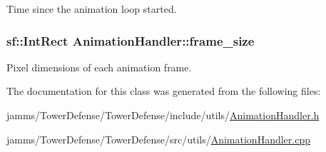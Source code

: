 Time since the animation loop started. 

\hypertarget{class_animation_handler_a8615fd6169591c5788c9f6a83cdf0ec7}{
\subsubsection[{frame\+\_\+size}]{\setlength{\rightskip}{0pt plus 5cm}sf\+::\+Int\+Rect Animation\+Handler\+::frame\+\_\+size}}\label{class_animation_handler_a8615fd6169591c5788c9f6a83cdf0ec7}


Pixel dimensions of each animation frame. 



The documentation for this class was generated from the following files\+:\begin{DoxyCompactItemize}
\item 
jamms/\+Tower\+Defense/\+Tower\+Defense/include/utils/\hyperlink{_animation_handler_8h}{Animation\+Handler.\+h}\item 
jamms/\+Tower\+Defense/\+Tower\+Defense/src/utils/\hyperlink{_animation_handler_8cpp}{Animation\+Handler.\+cpp}\end{DoxyCompactItemize}
